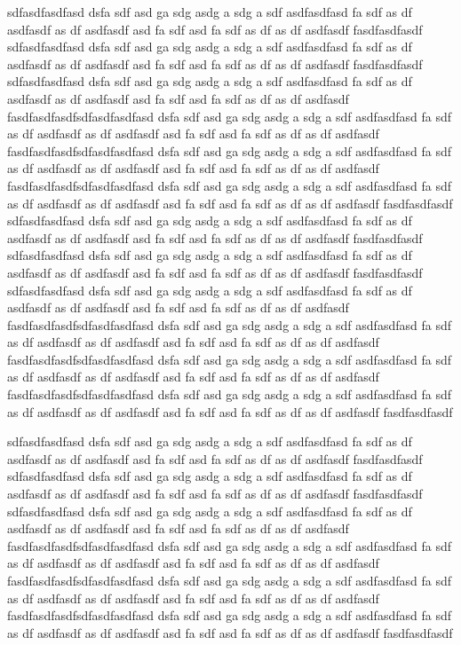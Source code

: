 \documentclass[12pt,a4paper]{article}
\begin{document}
\begin{multicols}{3}
sdfasdfasdfasd dsfa sdf asd ga sdg asdg a sdg a sdf asdfasdfasd fa sdf as df asdfasdf as df asdfasdf asd fa sdf asd fa sdf as df as df asdfasdf
fasdfasdfasdf
sdfasdfasdfasd dsfa sdf asd ga sdg asdg a sdg a sdf asdfasdfasd fa sdf as df asdfasdf as df asdfasdf asd fa sdf asd fa sdf as df as df asdfasdf
fasdfasdfasdf
sdfasdfasdfasd dsfa sdf asd ga sdg asdg a sdg a sdf asdfasdfasd fa sdf as df asdfasdf as df asdfasdf asd fa sdf asd fa sdf as df as df asdfasdf
fasdfasdfasdfsdfasdfasdfasd dsfa sdf asd ga sdg asdg a sdg a sdf asdfasdfasd fa sdf as df asdfasdf as df asdfasdf asd fa sdf asd fa sdf as df as df asdfasdf
fasdfasdfasdfsdfasdfasdfasd dsfa sdf asd ga sdg asdg a sdg a sdf asdfasdfasd fa sdf as df asdfasdf as df asdfasdf asd fa sdf asd fa sdf as df as df asdfasdf
fasdfasdfasdfsdfasdfasdfasd dsfa sdf asd ga sdg asdg a sdg a sdf asdfasdfasd fa sdf as df asdfasdf as df asdfasdf asd fa sdf asd fa sdf as df as df asdfasdf
fasdfasdfasdf
sdfasdfasdfasd dsfa sdf asd ga sdg asdg a sdg a sdf asdfasdfasd fa sdf as df asdfasdf as df asdfasdf asd fa sdf asd fa sdf as df as df asdfasdf
fasdfasdfasdf
sdfasdfasdfasd dsfa sdf asd ga sdg asdg a sdg a sdf asdfasdfasd fa sdf as df asdfasdf as df asdfasdf asd fa sdf asd fa sdf as df as df asdfasdf
fasdfasdfasdf
sdfasdfasdfasd dsfa sdf asd ga sdg asdg a sdg a sdf asdfasdfasd fa sdf as df asdfasdf as df asdfasdf asd fa sdf asd fa sdf as df as df asdfasdf
fasdfasdfasdfsdfasdfasdfasd dsfa sdf asd ga sdg asdg a sdg a sdf asdfasdfasd fa sdf as df asdfasdf as df asdfasdf asd fa sdf asd fa sdf as df as df asdfasdf
fasdfasdfasdfsdfasdfasdfasd dsfa sdf asd ga sdg asdg a sdg a sdf asdfasdfasd fa sdf as df asdfasdf as df asdfasdf asd fa sdf asd fa sdf as df as df asdfasdf
fasdfasdfasdfsdfasdfasdfasd dsfa sdf asd ga sdg asdg a sdg a sdf asdfasdfasd fa sdf as df asdfasdf as df asdfasdf asd fa sdf asd fa sdf as df as df asdfasdf
fasdfasdfasdf

sdfasdfasdfasd dsfa sdf asd ga sdg asdg a sdg a sdf asdfasdfasd fa sdf as df asdfasdf as df asdfasdf asd fa sdf asd fa sdf as df as df asdfasdf
fasdfasdfasdf
sdfasdfasdfasd dsfa sdf asd ga sdg asdg a sdg a sdf asdfasdfasd fa sdf as df asdfasdf as df asdfasdf asd fa sdf asd fa sdf as df as df asdfasdf
fasdfasdfasdf
sdfasdfasdfasd dsfa sdf asd ga sdg asdg a sdg a sdf asdfasdfasd fa sdf as df asdfasdf as df asdfasdf asd fa sdf asd fa sdf as df as df asdfasdf
fasdfasdfasdfsdfasdfasdfasd dsfa sdf asd ga sdg asdg a sdg a sdf asdfasdfasd fa sdf as df asdfasdf as df asdfasdf asd fa sdf asd fa sdf as df as df asdfasdf
fasdfasdfasdfsdfasdfasdfasd dsfa sdf asd ga sdg asdg a sdg a sdf asdfasdfasd fa sdf as df asdfasdf as df asdfasdf asd fa sdf asd fa sdf as df as df asdfasdf
fasdfasdfasdfsdfasdfasdfasd dsfa sdf asd ga sdg asdg a sdg a sdf asdfasdfasd fa sdf as df asdfasdf as df asdfasdf asd fa sdf asd fa sdf as df as df asdfasdf
fasdfasdfasdf


\end{multicols}
\end{document}
